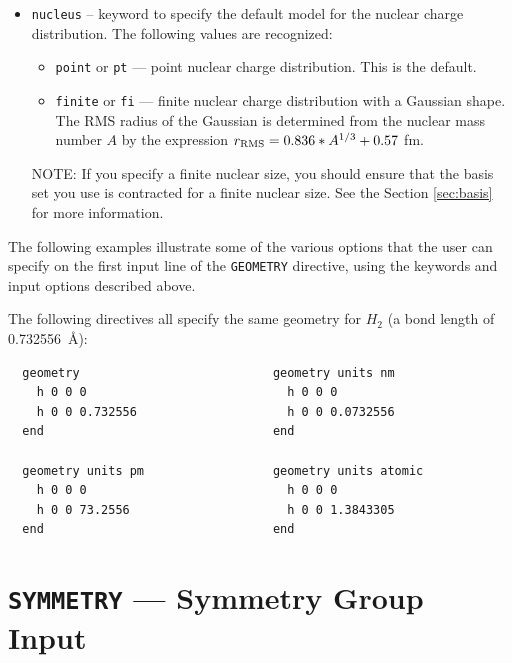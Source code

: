 \begin{itemize}
\item \verb+nucleus+ -- keyword to specify the default model for the nuclear
  charge distribution. The following values are recognized:
\begin{itemize}
\item \verb+point+ or \verb+pt+ --- point nuclear charge distribution. This
  is the default.
\item \verb+finite+ or \verb+fi+ --- finite nuclear charge distribution
  with a Gaussian shape. The RMS radius of the Gaussian is determined from
  the nuclear mass number $A$ by the expression 
  $r_{\rm RMS} = 0.836*A^{1/3}+0.57$ fm.
\end{itemize}
NOTE: If you specify a finite nuclear size, you should ensure that the basis
set you use is contracted for a finite nuclear size.  See the Section
\ref{sec:basis} for more information.

\end{itemize}

The following examples illustrate some of the various options that the
user can specify on the first input line of the \verb+GEOMETRY+
directive, using the keywords and input options described above.

The following directives all specify the same geometry for $H_2$ (a
bond length of 0.732556\ \AA):
\begin{verbatim}
  geometry                           geometry units nm    
    h 0 0 0                            h 0 0 0            
    h 0 0 0.732556                     h 0 0 0.0732556    
  end                                end                  

  geometry units pm                  geometry units atomic 
    h 0 0 0                            h 0 0 0             
    h 0 0 73.2556                      h 0 0 1.3843305     
  end                                end                   
\end{verbatim}
      
\section{{\tt SYMMETRY} --- Symmetry Group Input}
\label{sec:symgrp}

